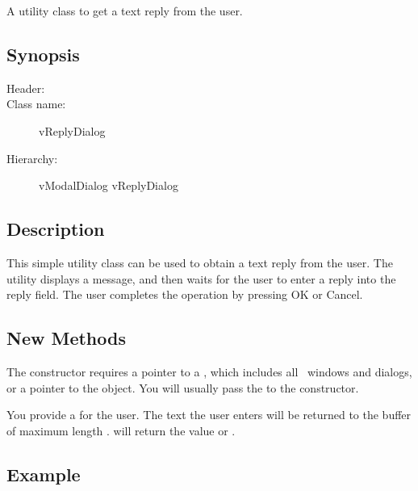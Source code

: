 

A utility class to get a text reply from the user.

\subsection* {Synopsis}

\begin{description}
        \item [Header:] 
        \item [Class name:] vReplyDialog
        \item [Hierarchy:] vModalDialog \rta vReplyDialog
\end{description}

\subsection* {Description}

This simple utility class can be used to obtain a text reply from
the user. The utility displays a message, and then waits for the
user to enter a reply into the reply field. The user completes the
operation by pressing OK or Cancel.

\subsection* {New Methods}


The  constructor requires a pointer to a
, which includes all \V\ windows and dialogs,
or a pointer to the  object.
You will usually pass the  to the constructor.


You provide a  for the user. The text the user enters
will be returned to the buffer  of maximum length .
 will return the value  or .

\subsection*{Example}

